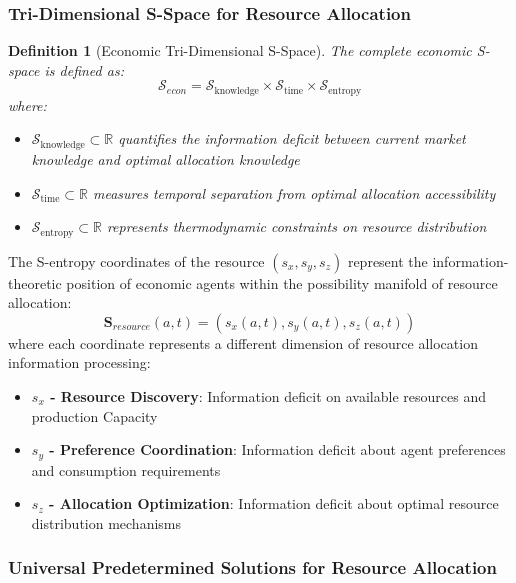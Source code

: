\documentclass[12pt,a4paper]{article}
\newtheorem{definition}[theorem]{Definition}
\begin{document}
\subsubsection{Tri-Dimensional S-Space for Resource Allocation}

\begin{definition}[Economic Tri-Dimensional S-Space]
The complete economic S-space is defined as:
\begin{equation}
\mathcal{S}_{econ} = \mathcal{S}_{\text{knowledge}} \times \mathcal{S}_{\text{time}} \times \mathcal{S}_{\text{entropy}}
\end{equation}
where:
\begin{itemize}
\item $\mathcal{S}_{\text{knowledge}} \subset \mathbb{R}$ quantifies the information deficit between current market knowledge and optimal allocation knowledge
\item $\mathcal{S}_{\text{time}} \subset \mathbb{R}$ measures temporal separation from optimal allocation accessibility  
\item $\mathcal{S}_{\text{entropy}} \subset \mathbb{R}$ represents thermodynamic constraints on resource distribution
\end{itemize}
\end{definition}


The S-entropy coordinates of the resource $(s_x, s_y, s_z)$ represent the information-theoretic position of economic agents within the possibility manifold of resource allocation:
\begin{equation}
\mathbf{S}_{resource}(a,t) = (s_x(a,t), s_y(a,t), s_z(a,t))
\end{equation}
where each coordinate represents a different dimension of resource allocation information processing:
\begin{itemize}
\item \textbf{$s_x$ - Resource Discovery}: Information deficit on available resources and production Capacity
\item \textbf{$s_y$ - Preference Coordination}: Information deficit about agent preferences and consumption requirements  
\item \textbf{$s_z$ - Allocation Optimization}: Information deficit about optimal resource distribution mechanisms
\end{itemize}

\subsubsection{Universal Predetermined Solutions for Resource Allocation}
\end{document}
